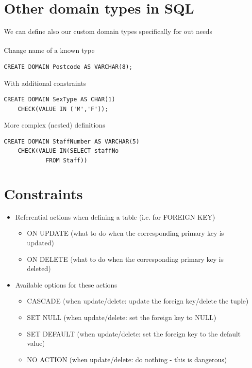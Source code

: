 \documentclass{article}[18pt]
\begin{document}
\section{Other domain types in SQL}
We can define also our custom domain types specifically for out needs\\
\\
Change name of a known type
\begin{verbatim}
CREATE DOMAIN Postcode AS VARCHAR(8);
\end{verbatim}
With additional constraints
\begin{verbatim}
CREATE DOMAIN SexType AS CHAR(1)
	CHECK(VALUE IN ('M','F'));
\end{verbatim}
More complex (nested) definitions
\begin{verbatim}
CREATE DOMAIN StaffNumber AS VARCHAR(5)
	CHECK(VALUE IN(SELECT staffNo
			FROM Staff))
\end{verbatim}
\section{Constraints}
\begin{itemize}
	\item Referential actions when defining a table (i.e. for FOREIGN KEY)
	\begin{itemize}
		\item ON UPDATE (what to do when the corresponding primary key is updated)
		\item ON DELETE (what to do when the corresponding primary key is deleted)
	\end{itemize}
	\item Available options for these actions
	\begin{itemize}
		\item CASCADE (when update/delete: update the foreign key/delete the tuple)
		\item SET NULL (when update/delete: set the foreign key to NULL)
		\item SET DEFAULT (when update/delete: set the foreign key to the default value)
		\item NO ACTION (when update/delete: do nothing - this is dangerous)
	\end{itemize}
\end{itemize}
\end{document}
